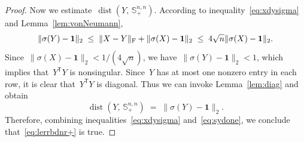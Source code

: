 \documentclass[11pt,a4paper]{article}  %
\theoremstyle{definition}
\DeclareMathOperator{\dist}{dist}
\newcommand{\stf}[1]{\mathbb{S}^{#1}}
\newcommand{\fro}{{\scriptstyle{\textnormal{F}}}}
\newcommand{\trs}{{\scriptstyle{\mathsf{T}}}}
\newcommand{\ones}{\mathbf{1}}
\begin{document}
\begin{proof}
    Now we estimate~$\dist(Y,\,\stf{n,n}_+)$. According to inequality~\eqref{eq:xdysigma} and
    Lemma~\ref{lem:vonNeumann},
    \begin{equation}
        \label{eq:sydone}
        \|\sigma(Y) - \ones\|_2 \;\le\; \|X-Y\|_\fro + \|\sigma(X) - \ones\|_2 \;\le\; 4\sqrt{n}
        \|\sigma(X) -\ones\|_2.
    \end{equation}
    Since~$\|\sigma(X)-\ones\|_2 < 1/(4\sqrt{n})$, we have~$\|\sigma(Y) - \ones\|_2 < 1$, which
    implies that~$Y^\trs Y$ is nonsingular.
    Since~$Y$ has at most one nonzero entry in each row, it is clear that~$Y^\trs Y$ is diagonal.
    Thus we can invoke Lemma~\ref{lem:diag} and obtain
    \begin{equation}
        \nonumber
        \dist(Y,\,\stf{n,n}_+) \;=\;\|\sigma(Y) -\ones\|_2.
    \end{equation}
    Therefore, combining inequalities~\eqref{eq:xdysigma} and~\eqref{eq:sydone},
    we conclude that~\eqref{eq:lerrbdnr+} is true.
\end{proof}
\end{document}

